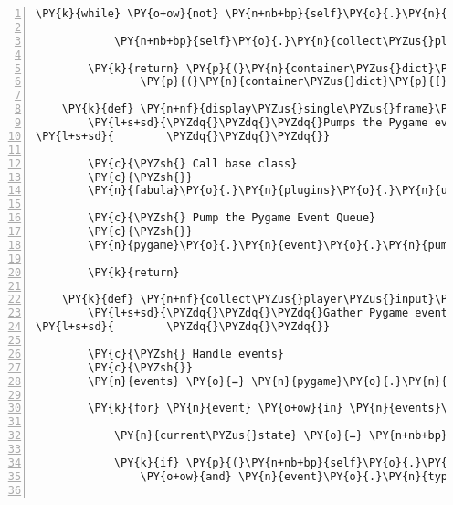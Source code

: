 \begin{Verbatim}[commandchars=\\\{\},numbers=left,firstnumber=1,stepnumber=1]
        \PY{k}{while} \PY{o+ow}{not} \PY{n+nb+bp}{self}\PY{o}{.}\PY{n}{connection\PYZus{}details\PYZus{}complete}\PY{p}{:}

            \PY{n+nb+bp}{self}\PY{o}{.}\PY{n}{collect\PYZus{}player\PYZus{}input}\PY{p}{(}\PY{p}{)}

        \PY{k}{return} \PY{p}{(}\PY{n}{container\PYZus{}dict}\PY{p}{[}\PY{l+s}{\PYZsq{}}\PY{l+s}{login\PYZus{}name}\PY{l+s}{\PYZsq{}}\PY{p}{]}\PY{p}{,}
                \PY{p}{(}\PY{n}{container\PYZus{}dict}\PY{p}{[}\PY{l+s}{\PYZsq{}}\PY{l+s}{connector}\PY{l+s}{\PYZsq{}}\PY{p}{]}\PY{p}{,} \PY{l+m+mi}{4011}\PY{p}{)}\PY{p}{)}

    \PY{k}{def} \PY{n+nf}{display\PYZus{}single\PYZus{}frame}\PY{p}{(}\PY{n+nb+bp}{self}\PY{p}{)}\PY{p}{:}
        \PY{l+s+sd}{\PYZdq{}\PYZdq{}\PYZdq{}Pumps the Pygame event queue.}
\PY{l+s+sd}{        \PYZdq{}\PYZdq{}\PYZdq{}}

        \PY{c}{\PYZsh{} Call base class}
        \PY{c}{\PYZsh{}}
        \PY{n}{fabula}\PY{o}{.}\PY{n}{plugins}\PY{o}{.}\PY{n}{ui}\PY{o}{.}\PY{n}{UserInterface}\PY{o}{.}\PY{n}{display\PYZus{}single\PYZus{}frame}\PY{p}{(}\PY{n+nb+bp}{self}\PY{p}{)}

        \PY{c}{\PYZsh{} Pump the Pygame Event Queue}
        \PY{c}{\PYZsh{}}
        \PY{n}{pygame}\PY{o}{.}\PY{n}{event}\PY{o}{.}\PY{n}{pump}\PY{p}{(}\PY{p}{)}

        \PY{k}{return}

    \PY{k}{def} \PY{n+nf}{collect\PYZus{}player\PYZus{}input}\PY{p}{(}\PY{n+nb+bp}{self}\PY{p}{)}\PY{p}{:}
        \PY{l+s+sd}{\PYZdq{}\PYZdq{}\PYZdq{}Gather Pygame events, scan for QUIT or special keys.}
\PY{l+s+sd}{        \PYZdq{}\PYZdq{}\PYZdq{}}

        \PY{c}{\PYZsh{} Handle events}
        \PY{c}{\PYZsh{}}
        \PY{n}{events} \PY{o}{=} \PY{n}{pygame}\PY{o}{.}\PY{n}{event}\PY{o}{.}\PY{n}{get}\PY{p}{(}\PY{p}{)}

        \PY{k}{for} \PY{n}{event} \PY{o+ow}{in} \PY{n}{events}\PY{p}{:}

            \PY{n}{current\PYZus{}state} \PY{o}{=} \PY{n+nb+bp}{self}\PY{o}{.}\PY{n}{input\PYZus{}state\PYZus{}stack}\PY{p}{[}\PY{o}{\PYZhy{}}\PY{l+m+mi}{1}\PY{p}{]}

            \PY{k}{if} \PY{p}{(}\PY{n+nb+bp}{self}\PY{o}{.}\PY{n}{host}\PY{o}{.}\PY{n}{room} \PY{o+ow}{is} \PY{o+ow}{not} \PY{n+nb+bp}{None}
                \PY{o+ow}{and} \PY{n}{event}\PY{o}{.}\PY{n}{type} \PY{o}{==} \PY{n}{pygame}\PY{o}{.}\PY{n}{KEYDOWN}\PY{p}{)}\PY{p}{:}


\end{Verbatim}
